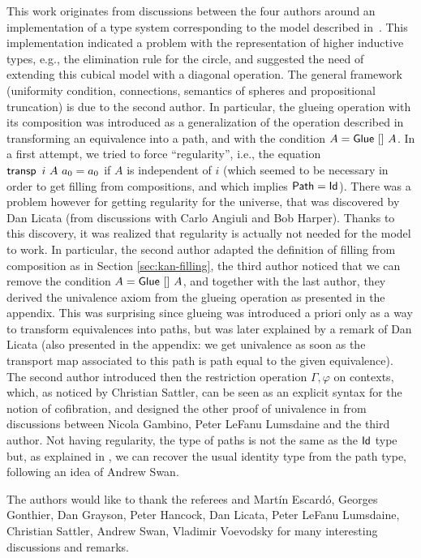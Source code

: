 \documentclass[10pt,a4paper,utf8]{article}
\theoremstyle{plain}
\theoremstyle{definition}
\theoremstyle{remark}
\begin{document}
This work originates from discussions between the four authors around an implementation
of a type system corresponding to the model described in~\cite{BCH}. This implementation
indicated a problem with the representation of higher inductive types, e.g., the elimination rule
for the circle, and suggested the need of extending this cubical model with a diagonal 
operation. The general framework (uniformity condition, connections, semantics of spheres and propositional 
truncation) is due to the second author. In particular, the glueing operation with its composition was 
introduced as a generalization of the operation described in~\cite{BCH} transforming an equivalence
into a path, and with the condition $A = {\sf Glue}~[]~A$. In a first attempt, we tried to force ``regularity'', 
i.e., the equation $\operatorname{\mathsf{transp}}~i~A~a_0 = a_0$ if $A$ is independent of $i$ (which seemed to be necessary
in  order to get filling from compositions, and which implies ${\sf Path} = {\sf Id}$).
There was a problem however for getting regularity for the universe, that was discovered by Dan Licata (from 
discussions with Carlo Angiuli and Bob Harper). Thanks to this discovery, it was realized that 
regularity is actually not needed for the model to work. In particular, the second author
adapted the definition of filling from composition as in Section \ref{sec:kan-filling},
the third author noticed that we can remove the condition $A = {\sf Glue}~[]~A$, and together with the last author,
they derived the univalence axiom from the glueing operation as presented in the appendix.
This was surprising since glueing was introduced
a priori only as a way to transform equivalences into paths, but was later explained by a remark of Dan Licata
(also presented in the appendix: we get univalence as soon as the transport map associated to this
path is path equal to the given equivalence). 
The second author introduced then the restriction operation $\Gamma,\varphi$
on contexts, which, as noticed by Christian Sattler, can be seen as an explicit syntax for the notion of 
cofibration, and designed the other proof of univalence in  from
discussions between Nicola Gambino, Peter LeFanu Lumsdaine and the third author. Not having regularity, the type of 
paths is not the same as the ${\sf Id}$ type but, as explained in , we can recover
the usual identity type from the path type, following an idea of Andrew Swan.

\medskip

The authors would like to thank the referees and Mart\'in Escard\'o, Georges Gonthier,
Dan Grayson, Peter Hancock, Dan Licata, Peter LeFanu Lumsdaine,
Christian Sattler, Andrew Swan, Vladimir Voevodsky for many
interesting discussions and remarks.



\newpage

\appendix

\end{document}
